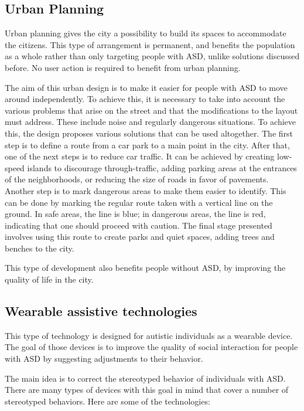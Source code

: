 \subsection{Urban Planning}

Urban planning gives the city a possibility to build its spaces to accommodate the citizens. This type of arrangement is permanent, and benefits the population as a whole rather than only targeting people with ASD, unlike solutions discussed before. No user action is required to benefit from urban planning.

The aim of this urban design is to make it easier for people with ASD to move around independently\cite{2018MobilityPoliciesExtraSmall}. To achieve this, it is necessary to take into account the various problems that arise on the street and that the modifications to the layout must address. These include noise and regularly dangerous situations. To achieve this, the design proposes various solutions that can be used altogether. The first step is to define a route from a car park to a main point in the city. After that, one of the next steps is to reduce car traffic. It can be achieved by creating low-speed islands to discourage through-traffic, adding parking areas at the entrances of the neighborhoods, or reducing the size of roads in favor of pavements. Another step is to mark dangerous areas to make them easier to identify. This can be done by marking the regular route taken with a vertical line on the ground. In safe areas, the line is blue; in dangerous areas, the line is red, indicating that one should proceed with caution. The final stage presented involves using this route to create parks and quiet spaces, adding trees and benches to the city.

This type of development also benefits people without ASD, by improving the quality of life in the city\cite{2018MobilityPoliciesExtraSmall}.

\subsection{Wearable assistive technologies}

This type of technology is designed for autistic individuals as a wearable device. The goal of those devices is to improve the quality of social interaction for people with ASD by suggesting adjustments to their behavior.

The main idea is to correct the stereotyped behavior of individuals with ASD\cite{2018WearableAssistiveTechnologies}. There are many types of devices with this goal in mind that cover a number of stereotyped behaviors. Here are some of the technologies:

